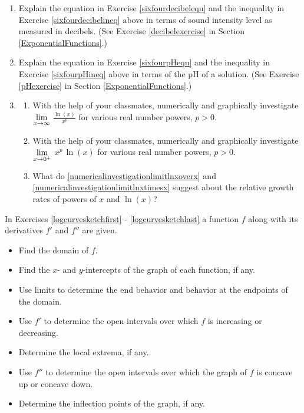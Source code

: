 \begin{enumerate}
\item Explain the equation in Exercise \ref{sixfourdecibelequ} and the inequality in Exercise \ref{sixfourdecibelineq} above in terms of sound intensity level as measured in decibels.  (See Exercise \ref{decibelexercise} in Section \ref{ExponentialFunctions}.)

\item Explain the equation in Exercise \ref{sixfourpHequ} and the inequality in Exercise \ref{sixfourpHineq} above in terms of the pH of a solution.  (See Exercise \ref{pHexercise} in Section \ref{ExponentialFunctions}.)

\item \label{powerloggrowthex} \begin{enumerate} \item\label{numericalinvestigationlimitlnxoverx} With the help of your classmates, numerically and graphically investigate $\displaystyle{\lim_{x \rightarrow \infty}}$ $\frac{\ln(x)}{x^{p}}$ for various real number powers, $p > 0$.

 \item\label{numericalinvestigationlimitlnxtimesx} With the help of your classmates, numerically and graphically investigate $\displaystyle{\lim_{x \rightarrow 0^{+}}}$ $x^{p} \, \ln(x) $ for various real number powers, $p > 0$.

\item  What do \ref{numericalinvestigationlimitlnxoverx} and \ref{numericalinvestigationlimitlnxtimesx} suggest about the relative growth rates of powers of $x$ and $\ln(x)$?

\end{enumerate}  

\setcounter{HW}{\value{enumi}}
\end{enumerate}

In Exercises \ref{logcurvesketchfirst}  - \ref{logcurvesketchlast} a function $f$ along with its derivatives $f'$ and $f''$ are given.

\begin{itemize}

\item  Find the domain of $f$.

\item  Find the $x$- and $y$-intercepts of the graph of each function, if any.

\item  Use limits to determine the end behavior and behavior at the endpoints of the domain.

\item  Use $f'$ to determine the open intervals over which $f$ is increasing or decreasing.

\item Determine the local extrema, if any.

\item  Use $f''$ to determine the open intervals over which the graph of $f$  is concave up or concave down.

\item  Determine the inflection points of the graph, if any.

\end{itemize}

